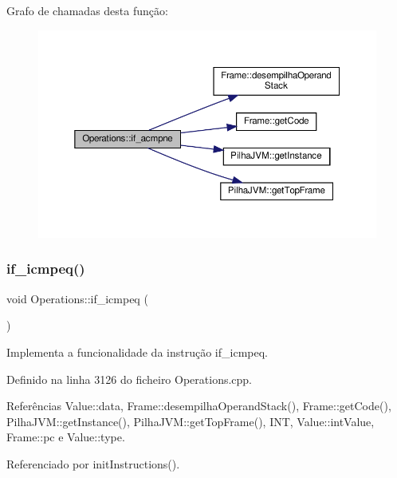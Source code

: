 Grafo de chamadas desta função\+:\nopagebreak
\begin{figure}[H]
\begin{center}
\leavevmode
\includegraphics[width=350pt]{classOperations_a7f43bbfba9b2feb66b695d24c43dc430_cgraph}
\end{center}
\end{figure}
\mbox{\label{classOperations_a43a49ccd4f1160c0b1968af4296fa2b3}} 
\subsubsection{\texorpdfstring{if\+\_\+icmpeq()}{if\_icmpeq()}}
{\footnotesize\ttfamily void Operations\+::if\+\_\+icmpeq (\begin{DoxyParamCaption}{ }\end{DoxyParamCaption})\hspace{0.3cm}{\ttfamily [private]}}



Implementa a funcionalidade da instrução if\+\_\+icmpeq. 



Definido na linha 3126 do ficheiro Operations.\+cpp.



Referências Value\+::data, Frame\+::desempilha\+Operand\+Stack(), Frame\+::get\+Code(), Pilha\+J\+V\+M\+::get\+Instance(), Pilha\+J\+V\+M\+::get\+Top\+Frame(), I\+NT, Value\+::int\+Value, Frame\+::pc e Value\+::type.



Referenciado por init\+Instructions().


